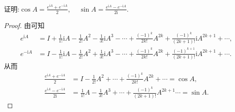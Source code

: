 \documentclass[../../main.tex]{subfiles}%
\begin{document}
\begin{theorem}\label{theorem:矩阵三角函数的一般表达式}
证明:$\cos A = \frac{e^{\mathrm{i}A}+e^{-\mathrm{i}A}}{2}$,$\quad$ $\sin A = \frac{e^{\mathrm{i}A}-e^{-\mathrm{i}A}}{2\mathrm{i}}$.
\end{theorem}
\begin{proof}

由可知
\begin{align*}
e^{\mathrm{i}A}&=I+\frac{1}{1!}\mathrm{i}A-\frac{1}{2!}A^2-\frac{1}{3!}\mathrm{i}A^3-\cdots +\frac{\left( -1 \right) ^k}{2k!}A^{2k}+\frac{\left( -1 \right) ^k}{\left( 2k+1 \right) !}\mathrm{i}A^{2k+1}+\cdots,\\
e^{-\mathrm{i}A}&=I-\frac{1}{1!}\mathrm{i}A-\frac{1}{2!}A^2+\frac{1}{3!}\mathrm{i}A^3-\cdots +\frac{\left( -1 \right) ^k}{2k!}A^{2k}+\frac{\left( -1 \right) ^{k+1}}{\left( 2k+1 \right) !}\mathrm{i}A^{2k+1}+\cdots.
\end{align*}
从而
\begin{align*}
\frac{e^{\mathrm{i}A}+e^{-\mathrm{i}A}}{2}&=I-\frac{1}{2!}A^2+\cdots +\frac{\left( -1 \right) ^k}{2k!}A^{2k}+\cdots =\cos A,\\
\frac{e^{\mathrm{i}A}-e^{-\mathrm{i}A}}{2\mathrm{i}}&=\frac{1}{1!}A-\frac{1}{3!}A^3+\cdots +\frac{\left( -1 \right) ^k}{\left( 2k+1 \right) !}A^{2k+1}\cdots =\sin A.
\end{align*}

\end{proof}
\end{document}
